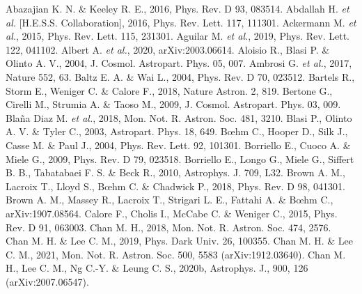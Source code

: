 \documentclass[useAMS,usenatbib]{mn2e}
\begin{document}
\begin{thebibliography}{}
 Abazajian K. N. \& Keeley R. E., 2016, Phys. Rev. D 93, 083514.
 Abdallah H. {\it et al.} [H.E.S.S. Collaboration], 2016, Phys. Rev. Lett. 117, 111301.
 Ackermann M. {\it et al.}, 2015, Phys. Rev. Lett. 115, 231301.
 Aguilar M. {\it et al.}, 2019, Phys. Rev. Lett. 122, 041102.
 Albert A. {\it et al.}, 2020, arXiv:2003.06614.
 Aloisio R., Blasi P. \& Olinto A. V., 2004, J. Cosmol. Astropart. Phys. 05, 007.
 Ambrosi G. {\it et al.}, 2017, Nature 552, 63.
 Baltz E. A. \& Wai L., 2004, Phys. Rev. D 70, 023512.
 Bartels R., Storm E., Weniger C. \& Calore F., 2018, Nature Astron. 2, 819.
 Bertone G., Cirelli M., Strumia A. \& Taoso M., 2009, J. Cosmol. Astropart. Phys. 03, 009.
 Bla\~na Diaz M. {\it et al.}, 2018, Mon. Not. R. Astron. Soc. 481, 3210.
 Blasi P., Olinto A. V. \& Tyler C., 2003, Astropart. Phys. 18, 649.
 B\oe hm C., Hooper D., Silk J., Casse M. \& Paul J., 2004, Phys. Rev. Lett. 92, 101301.
 Borriello E., Cuoco A. \& Miele G., 2009, Phys. Rev. D 79, 023518.
 Borriello E., Longo G., Miele G., Siffert B. B., Tabatabaei F. S. \& Beck R., 2010, Astrophys. J. 709, L32.
 Brown A. M., Lacroix T., Lloyd S., B\oe hm C. \& Chadwick P., 2018, Phys. Rev. D 98, 041301.
 Brown A. M., Massey R., Lacroix T., Strigari L. E., Fattahi A. \& B\oe hm C., arXiv:1907.08564.
 Calore F., Cholis I., McCabe C. \& Weniger C., 2015, Phys. Rev. D 91, 063003.
 Chan M. H., 2018, Mon. Not. R. Astron. Soc. 474, 2576.
 Chan M. H. \& Lee C. M., 2019, Phys. Dark Univ. 26, 100355.
 Chan M. H. \& Lee C. M., 2021, Mon. Not. R. Astron. Soc. 500, 5583 (arXiv:1912.03640).
 Chan M. H., Lee C. M., Ng C.-Y. \& Leung C. S., 2020b, Astrophys. J., 900, 126 (arXiv:2007.06547).

\end{thebibliography}
\end{document}
